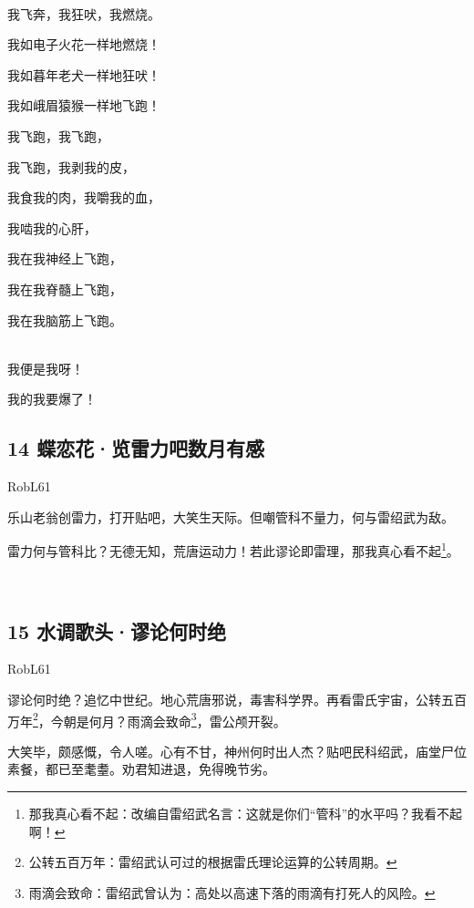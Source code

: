 ~\\
我飞奔，我狂吠，我燃烧。

我如电子火花一样地燃烧！

我如暮年老犬一样地狂吠！

我如峨眉猿猴一样地飞跑！

我飞跑，我飞跑，

我飞跑，我剥我的皮，

我食我的肉，我嚼我的血，

我啮我的心肝，

我在我神经上飞跑，

我在我脊髓上飞跑，

我在我脑筋上飞跑。

~\\
我便是我呀！

我的我要爆了！

\hypertarget{ux8776ux604bux82b1ux89c8ux96f7ux529bux5427ux6570ux6708ux6709ux611f}{%
\subsection{14
蝶恋花·览雷力吧数月有感}\label{ux8776ux604bux82b1ux89c8ux96f7ux529bux5427ux6570ux6708ux6709ux611f}}

RobL61

乐山老翁创雷力，打开贴吧，大笑生天际。但嘲管科不量力，何与雷绍武为敌。

雷力何与管科比？无德无知，荒唐运动力！若此谬论即雷理，那我真心看不起\footnote{那我真心看不起：改编自雷绍武名言：这就是你们``管科''的水平吗？我看不起啊！}。

~\\

\hypertarget{ux6c34ux8c03ux6b4cux5934ux8c2cux8bbaux4f55ux65f6ux7edd}{%
\subsection{15
水调歌头·谬论何时绝}\label{ux6c34ux8c03ux6b4cux5934ux8c2cux8bbaux4f55ux65f6ux7edd}}

RobL61

谬论何时绝？追忆中世纪。地心荒唐邪说，毒害科学界。再看雷氏宇宙，公转五百万年\footnote{公转五百万年：雷绍武认可过的根据雷氏理论运算的公转周期。}，今朝是何月？雨滴会致命\footnote{雨滴会致命：雷绍武曾认为：高处以高速下落的雨滴有打死人的风险。}，雷公颅开裂。

大笑毕，颇感慨，令人嗟。心有不甘，神州何时出人杰？贴吧民科绍武，庙堂尸位素餐，都已至耄耋。劝君知进退，免得晚节劣。
~\\

